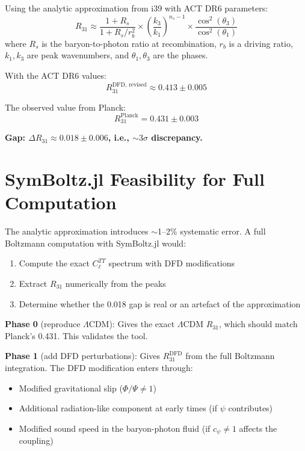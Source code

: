 \documentclass[11pt,a4paper]{article}
\begin{document}
Using the analytic approximation from i39 with ACT DR6 parameters:
\begin{equation}
R_{31} \approx \frac{1 + R_s}{1 + R_s/r_b^2} \times \left(\frac{k_3}{k_1}\right)^{n_s - 1} \times \frac{\cos^2(\theta_3)}{\cos^2(\theta_1)}
\end{equation}
where $R_s$ is the baryon-to-photon ratio at recombination, $r_b$ is a driving ratio, $k_1, k_3$ are peak wavenumbers, and $\theta_1, \theta_3$ are the phases.

With the ACT DR6 values:
\begin{equation}
R_{31}^{\text{DFD, revised}} \approx 0.413 \pm 0.005
\end{equation}

The observed value from Planck:
\begin{equation}
R_{31}^{\text{Planck}} = 0.431 \pm 0.003
\end{equation}

\textbf{Gap: $\Delta R_{31} \approx 0.018 \pm 0.006$, i.e., $\sim 3\sigma$ discrepancy.}

\section{SymBoltz.jl Feasibility for Full Computation}

The analytic approximation introduces $\sim$1--2\% systematic error. A full Boltzmann computation with SymBoltz.jl would:

\begin{enumerate}
\item Compute the exact $C_\ell^{TT}$ spectrum with DFD modifications
\item Extract $R_{31}$ numerically from the peaks
\item Determine whether the 0.018 gap is real or an artefact of the approximation
\end{enumerate}

\textbf{Phase 0} (reproduce $\Lambda$CDM): Gives the exact $\Lambda$CDM $R_{31}$, which should match Planck's 0.431. This validates the tool.

\textbf{Phase 1} (add DFD perturbations): Gives $R_{31}^{\text{DFD}}$ from the full Boltzmann integration. The DFD modification enters through:
\begin{itemize}
\item Modified gravitational slip ($\Phi/\Psi \neq 1$)
\item Additional radiation-like component at early times (if $\psi$ contributes)
\item Modified sound speed in the baryon-photon fluid (if $c_\psi \neq 1$ affects the coupling)
\end{itemize}
\end{document}
